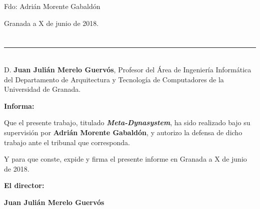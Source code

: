 \vspace{6cm}

\noindent Fdo: Adrián Morente Gabaldón

\vspace{2cm}

\begin{flushright}
Granada a X de junio de 2018.
\end{flushright}


\chapter*{}
\thispagestyle{empty}

\noindent\rule[-1ex]{\textwidth}{2pt}\\[4.5ex]

D. \textbf{Juan Julián Merelo Guervós}, Profesor del Área de Ingeniería Informática del Departamento de Arquitectura y Tecnología de Computadores de la Universidad de Granada.

\vspace{0.5cm}

\textbf{Informa:}

\vspace{0.5cm}

Que el presente trabajo, titulado \textit{\textbf{Meta-Dynasystem}}, ha sido realizado bajo su supervisión por \textbf{Adrián Morente Gabaldón}, y autorizo la defensa de dicho trabajo ante el tribunal que corresponda.

\vspace{0.5cm}

Y para que conste, expide y firma el presente informe en Granada a X de junio de 2018.

\vspace{1cm}

\textbf{El director:}

\vspace{5cm}

\noindent \textbf{Juan Julián Merelo Guervós}
